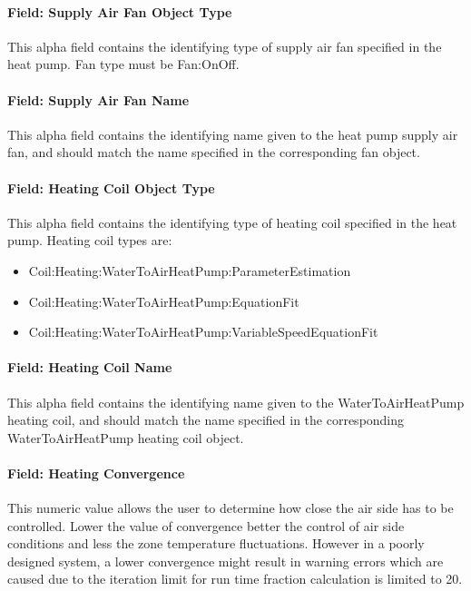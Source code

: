 \paragraph{Field: Supply Air Fan Object Type}\label{field-supply-air-fan-object-type-2}

This alpha field contains the identifying type of supply air fan specified in the heat pump. Fan type must be Fan:OnOff.

\paragraph{Field: Supply Air Fan Name}\label{field-supply-air-fan-name-2}

This alpha field contains the identifying name given to the heat pump supply air fan, and should match the name specified in the corresponding fan object.

\paragraph{Field: Heating Coil Object Type}\label{field-heating-coil-object-type-7}

This alpha field contains the identifying type of heating coil specified in the heat pump. Heating coil types are:

\begin{itemize}
\item
  Coil:Heating:WaterToAirHeatPump:ParameterEstimation
\item
  Coil:Heating:WaterToAirHeatPump:EquationFit
\item
  Coil:Heating:WaterToAirHeatPump:VariableSpeedEquationFit
\end{itemize}

\paragraph{Field: Heating Coil Name}\label{field-heating-coil-name-7}

This alpha field contains the identifying name given to the WaterToAirHeatPump heating coil, and should match the name specified in the corresponding WaterToAirHeatPump heating coil object.

\paragraph{Field: Heating Convergence}\label{field-heating-convergence}

This numeric value allows the user to determine how close the air side has to be controlled. Lower the value of convergence better the control of air side conditions and less the zone temperature fluctuations. However in a poorly designed system, a lower convergence might result in warning errors which are caused due to the iteration limit for run time fraction calculation is limited to 20.

